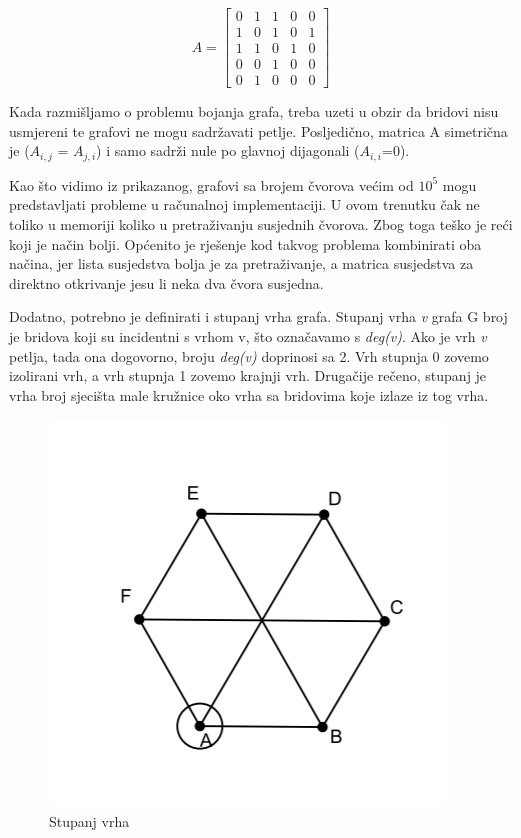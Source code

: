 \documentclass[times, utf8, zavrsni, numeric]{fer}
\begin{document}
\begin{equation*}
	A = 
	\begin{bmatrix}
		0 & 1 & 1 & 0 & 0 \\
		1 & 0 & 1 & 0 & 1 \\
		1 & 1 & 0 & 1 & 0 \\
		0 & 0 & 1 & 0 & 0 \\
		0 & 1 & 0 & 0 & 0
		
	\end{bmatrix}
\end{equation*}

Kada razmišljamo o problemu bojanja grafa, treba uzeti u obzir da bridovi nisu usmjereni te grafovi ne mogu sadržavati petlje. Posljedično, matrica A simetrična je ($\textit{$A_{i,j}$}$ = $\textit{$A_{j,i}$}$) i samo sadrži nule po glavnoj dijagonali ($\textit{$A_{i,i}$}$=0). 

Kao što vidimo iz prikazanog, grafovi sa brojem čvorova većim od $10^{5}$ mogu predstavljati probleme u računalnoj implementaciji. U ovom trenutku čak ne toliko u memoriji koliko u pretraživanju susjednih čvorova. Zbog toga teško je reći koji je način bolji. Općenito je rješenje kod takvog problema kombinirati oba načina, jer lista susjedstva bolja je za pretraživanje, a matrica susjedstva za direktno otkrivanje jesu li neka dva čvora susjedna.\par
Dodatno, potrebno je definirati i stupanj vrha grafa. Stupanj vrha \textit{v} grafa G broj je bridova koji su incidentni s vrhom v, što označavamo s \textit{deg(v)}. Ako je vrh \textit{v} petlja, tada ona dogovorno, broju \textit{deg(v)} doprinosi sa 2. Vrh stupnja 0 zovemo izolirani vrh, a vrh stupnja 1 zovemo krajnji vrh. Drugačije rečeno, stupanj je vrha broj sjecišta male kružnice oko vrha sa bridovima koje izlaze iz tog vrha.

\begin{figure}[h]
	\centering
	\includegraphics[width=0.5\columnwidth]{slike/stupanj-vrha.png}
	\caption{Stupanj vrha}
	\label{fig:stupanj-vrha}
\end{figure}
\end{document}
